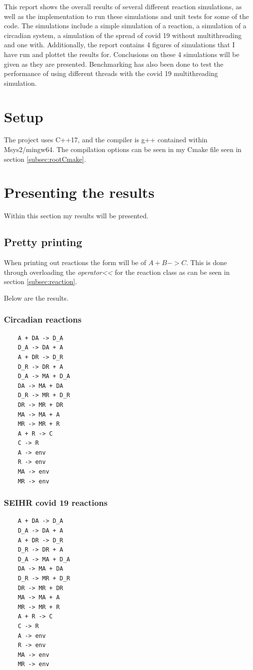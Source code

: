 This report shows the overall results of several different reaction simulations, as well as the implementation to run these simulations and unit tests for some of the code. 
The simulations include a simple simulation of a reaction, a simulation of a circadian system, a simulation of the spread of covid 19 without multithreading and one with.
Additionally, the report contains 4 figures of simulations that I have run and plottet the results for.
Conclusions on these 4 simulations will be given as they are presented.
Benchmarking has also been done to test the performance of using different threads with the covid 19 multithreading simulation.

\section{Setup}
The project uses C++17, and the compiler is g++ contained within Msys2/mingw64.
The compilation options can be seen in my Cmake file seen in section \ref{subsec:rootCmake}.

\section{Presenting the results}
Within this section my results will be presented.
\subsection{Pretty printing}
When printing out reactions the form will be of $A + B -> C$. This is done through overloading the \textit{operator<<} for the reaction class as can be seen in section \ref{subsec:reaction}.

Below are the results.

\subsubsection{Circadian reactions}
\begin{verbatim}
    A + DA -> D_A
    D_A -> DA + A
    A + DR -> D_R
    D_R -> DR + A
    D_A -> MA + D_A
    DA -> MA + DA
    D_R -> MR + D_R
    DR -> MR + DR
    MA -> MA + A
    MR -> MR + R
    A + R -> C
    C -> R
    A -> env
    R -> env
    MA -> env
    MR -> env
\end{verbatim}

\subsubsection{SEIHR covid 19 reactions}
\begin{verbatim}
    A + DA -> D_A
    D_A -> DA + A
    A + DR -> D_R
    D_R -> DR + A
    D_A -> MA + D_A
    DA -> MA + DA
    D_R -> MR + D_R
    DR -> MR + DR
    MA -> MA + A
    MR -> MR + R
    A + R -> C
    C -> R
    A -> env
    R -> env
    MA -> env
    MR -> env
\end{verbatim}

